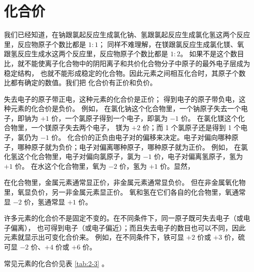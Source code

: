 \section{化合价}\label{sec:2-6}

我们已经知道，在钠跟氯起反应生成氯化钠、氢跟氯起反应生成氯化氢这两个反应里，反应物原子个数比都是 $1:1$；
同样不难理解，在镁跟氯反应生成氯化镁、氧跟氢反应生成水这两个反应里，反应物原子个数比都是 $1:2$。
如果不是这个数目比，就不能使离子化合物中的阴阳离子和共价化合物分子中原子的最外电子层成为稳定结构，
也就不能形成稳定的化合物。因此元素之间相互化合时，其原子个数比都有确定的数值。我们把%
化合价有正价和负价。

失去电子的原子带正电，这种元素的化合价是正价；
得到电子的原子带负电，这种元素的化合价是负价。
例如，
在氯化钠这个化合物里，一个钠原子失去一个电子，即钠为 $+1$ 价，一个氯原子得到一个电子，即氯为 $-1$ 价。
在氯化镁这个化合物里，一个镁原子失去两个电子，  镁为 $+2$ 价；而 1 个氯原子还是得到 1 个电子，氯仍为 $-1$ 价。
化合价的正负由电子对的偏移来决定。电子对偏向哪种原子，哪种原子就为负价；电子对偏离哪种原子，哪种原子就为正价。
例如，
在氯化氢这个化合物里，电子对偏向氯原子，氯为 $-1$ 价，电子对偏离氢原子，氢为 $+1$ 价。
在水这个化合物里，氧为 $-2$ 价，氢为 $+1$ 价。显然，

在化合物里，金属元素通常显正价，非金属元素通常显负价。
但在非金属氧化物里，氧显负价，另一非金属元素显正价。
氧和氢在它们各自的化合物里，氧通常显 $-2$ 价，氢通常显 $+1$ 价。

许多元素的化合价不是固定不变的。在不同条件下，同一原子既可失去电子（或电子偏离），
也可得到电子（或电子偏近）；而且失去电子的数目也可以不同，因此元素就显示出可变化合价来。
例如，在不同条件下，铁可显 $+2$ 价或 $+3$ 价，硫可显 $-2$ 价、$+4$ 价或 $+6$ 价。

常见元素的化合价见表 \ref{tab:2-3} 。



